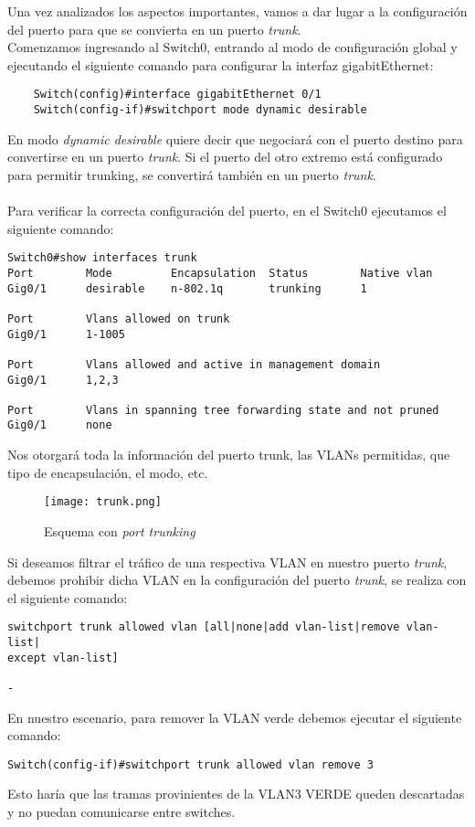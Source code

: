 \documentclass{article}
\begin{document}
Una vez analizados los aspectos importantes, vamos a dar lugar a la configuración del puerto para que se convierta en un puerto \textit{trunk}.
\\
Comenzamos ingresando al Switch0, entrando al modo de configuración global y ejecutando el siguiente comando para configurar la interfaz gigabitEthernet:
\begin{lstlisting}
    Switch(config)#interface gigabitEthernet 0/1
    Switch(config-if)#switchport mode dynamic desirable 
\end{lstlisting}
En modo \textit{dynamic desirable} quiere decir que negociará con el puerto destino para convertirse en un puerto \textit{trunk}. Si el puerto del otro extremo está configurado para permitir trunking, se convertirá también en un puerto \textit{trunk}.
\\\\
Para verificar la correcta configuración del puerto, en el Switch0 ejecutamos el siguiente comando:
\begin{lstlisting}
Switch0#show interfaces trunk
Port        Mode         Encapsulation  Status        Native vlan
Gig0/1      desirable    n-802.1q       trunking      1

Port        Vlans allowed on trunk
Gig0/1      1-1005

Port        Vlans allowed and active in management domain
Gig0/1      1,2,3

Port        Vlans in spanning tree forwarding state and not pruned
Gig0/1      none
\end{lstlisting}
Nos otorgará toda la información del puerto trunk, las VLANs permitidas, que tipo de encapsulación, el modo, etc.

\begin{figure}[H]
    \centering
    \texttt{[image: trunk.png]}    
    \caption{Esquema con \textit{port trunking}}
    \label{fig:enter-label}
\end{figure}
Si deseamos filtrar el tráfico de una respectiva VLAN en nuestro puerto \textit{trunk}, debemos prohibir dicha VLAN en la configuración del puerto \textit{trunk}, se realiza con el siguiente comando:
\begin{lstlisting}
switchport trunk allowed vlan [all|none|add vlan-list|remove vlan-list| 
except vlan-list]

-
\end{lstlisting}
En nuestro escenario, para remover la VLAN verde debemos ejecutar el siguiente comando:
\begin{lstlisting}
Switch(config-if)#switchport trunk allowed vlan remove 3
\end{lstlisting}
Esto haría que las tramas provinientes de la VLAN3 VERDE queden descartadas y no puedan comunicarse entre switches.
\end{document}
